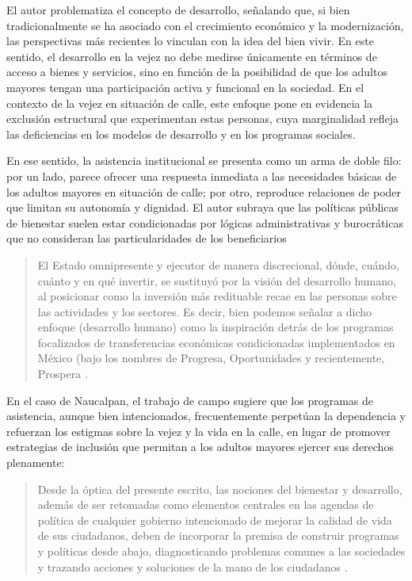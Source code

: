 \documentclass[
  spanish,
  11pt,
  a4paper,
]{scrbook}
\begin{document}
El autor problematiza el concepto de desarrollo, señalando que, si bien
tradicionalmente se ha asociado con el crecimiento económico y la
modernización, las perspectivas más recientes lo vinculan con la idea
del bien vivir. En este sentido, el desarrollo en la vejez no debe
medirse únicamente en términos de acceso a bienes y servicios, sino en
función de la posibilidad de que los adultos mayores tengan una
participación activa y funcional en la sociedad. En el contexto de la
vejez en situación de calle, este enfoque pone en evidencia la exclusión
estructural que experimentan estas personas, cuya marginalidad refleja
las deficiencias en los modelos de desarrollo y en los programas
sociales.

En ese sentido, la asistencia institucional se presenta como un arma de
doble filo: por un lado, parece ofrecer una respuesta inmediata a las
necesidades básicas de los adultos mayores en situación de calle; por
otro, reproduce relaciones de poder que limitan su autonomía y dignidad.
El autor subraya que las políticas públicas de bienestar suelen estar
condicionadas por lógicas administrativas y burocráticas que no
consideran las particularidades de los beneficiarios

\begin{quote}
El Estado omnipresente y ejecutor de manera discrecional, dónde, cuándo,
cuánto y en qué invertir, se sustituyó por la visión del desarrollo
humano, al posicionar como la inversión más redituable recae en las
personas sobre las actividades y los sectores. Es decir, bien podemos
señalar a dicho enfoque (desarrollo humano) como la inspiración detrás
de los programas focalizados de transferencias económicas condicionadas
implementados en México (bajo los nombres de Progresa, Oportunidades y
recientemente, Prospera \autocite[303]{Lopez2019}.
\end{quote}

En el caso de Naucalpan, el trabajo de campo sugiere que los programas
de asistencia, aunque bien intencionados, frecuentemente perpetúan la
dependencia y refuerzan los estigmas sobre la vejez y la vida en la
calle, en lugar de promover estrategias de inclusión que permitan a los
adultos mayores ejercer sus derechos plenamente:

\begin{quote}
Desde la óptica del presente escrito, las nociones del bienestar y
desarrollo, además de ser retomadas como elementos centrales en las
agendas de política de cualquier gobierno intencionado de mejorar la
calidad de vida de sus ciudadanos, deben de incorporar la premisa de
construir programas y políticas desde abajo, diagnosticando problemas
comunes a las sociedades y trazando acciones y soluciones de la mano de
los ciudadanos \autocite[311]{Lopez2019}.
\end{quote}
\end{document}
